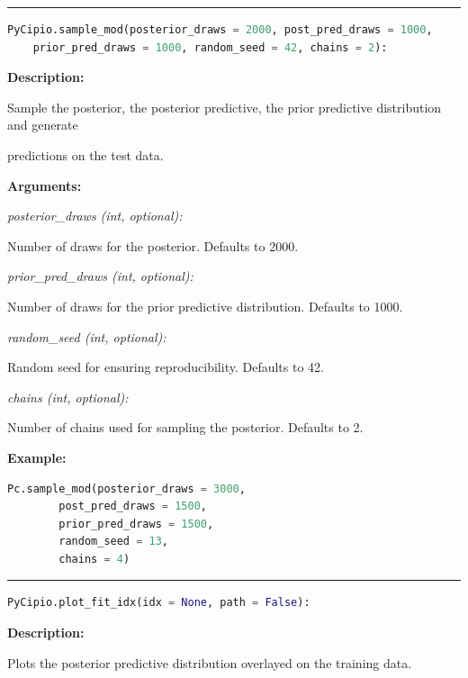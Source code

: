 \documentclass{article}
\begin{document}

\hrule

\begin{lstlisting}[language=Python]
    PyCipio.sample_mod(posterior_draws = 2000, post_pred_draws = 1000, 
    prior_pred_draws = 1000, random_seed = 42, chains = 2):
\end{lstlisting}

\indent \textbf{Description:} 

\indent \indent Sample the posterior, the posterior predictive, the prior predictive distribution and generate 

\indent \indent predictions on the test data.

\indent \textbf{Arguments:}

\indent \indent \textit{posterior\_draws (int, optional):} 

\indent \indent \indent Number of draws for the posterior. Defaults to 2000.

\indent \indent \textit{prior\_pred\_draws (int, optional):} 

\indent \indent \indent Number of draws for the prior predictive distribution. Defaults to 1000.

\indent \indent \textit{random\_seed (int, optional):}

\indent \indent \indent Random seed for ensuring reproducibility. Defaults to 42.

\indent \indent \textit{chains (int, optional):} 

\indent \indent \indent Number of chains used for sampling the posterior. Defaults to 2.

\indent \textbf{Example:}

\begin{lstlisting}[language=Python]
        Pc.sample_mod(posterior_draws = 3000, 
        post_pred_draws = 1500, 
        prior_pred_draws = 1500, 
        random_seed = 13, 
        chains = 4)
\end{lstlisting}


\hrule

\begin{lstlisting}[language=Python]
    PyCipio.plot_fit_idx(idx = None, path = False):
\end{lstlisting}

\indent \textbf{Description:} 

\indent \indent Plots the posterior predictive distribution overlayed on the training data.
\end{document}
